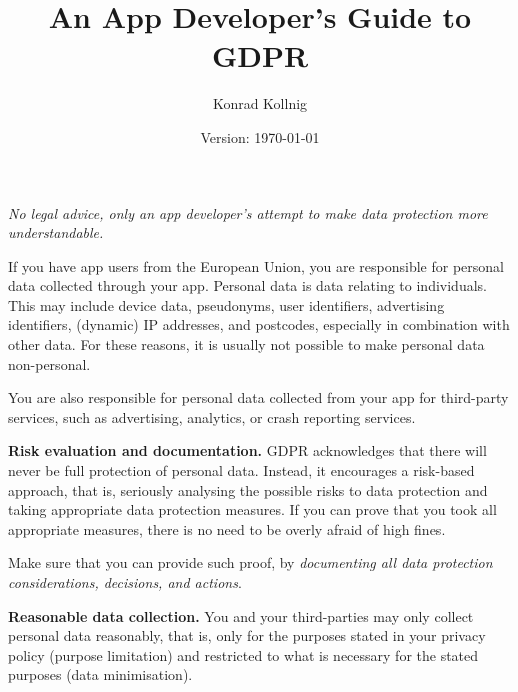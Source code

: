 \documentclass[
	12pt,
	a4paper,
	]{scrartcl}
\begin{document}
	\title{An App Developer's Guide to GDPR}
	\author{Konrad Kollnig}
	\date{Version: \today}
	\maketitle
	
	\begin{center}
		\emph{No legal advice, only an app developer’s attempt to make 
		data protection more understandable.}
	\end{center}
	
	If you have app users from the European Union, you are responsible for
	personal data collected through your app. Personal data is data 
	relating
	to individuals. This may include device data, pseudonyms, user
	identifiers, advertising identifiers, (dynamic) IP addresses, and
	postcodes, especially in combination with other data. For these 
	reasons,
	it is usually not possible to make personal data non-personal.
	
	You are also responsible for personal data collected from your app for
	third-party services, such as advertising, analytics, or crash 
	reporting
	services.
	
	\textbf{Risk evaluation and documentation.} GDPR acknowledges that 
	there
	will never be full protection of personal data. Instead, it encourages 
	a
	risk-based approach, that is, seriously analysing the possible risks to
	data protection and taking appropriate data protection measures. If you
	can prove that you took all appropriate measures, there is no need to 
	be
	overly afraid of high fines.
	
	Make sure that you can provide such proof, by \emph{documenting all 
	data
	protection considerations, decisions, and actions}.
	
	\textbf{Reasonable data collection.} You and your third-parties may 
	only
	collect personal data reasonably, that is, only for the
	purposes stated in your privacy policy (purpose limitation) and 
	restricted to what is necessary for the stated purposes (data 
	minimisation).
	
\end{document}
